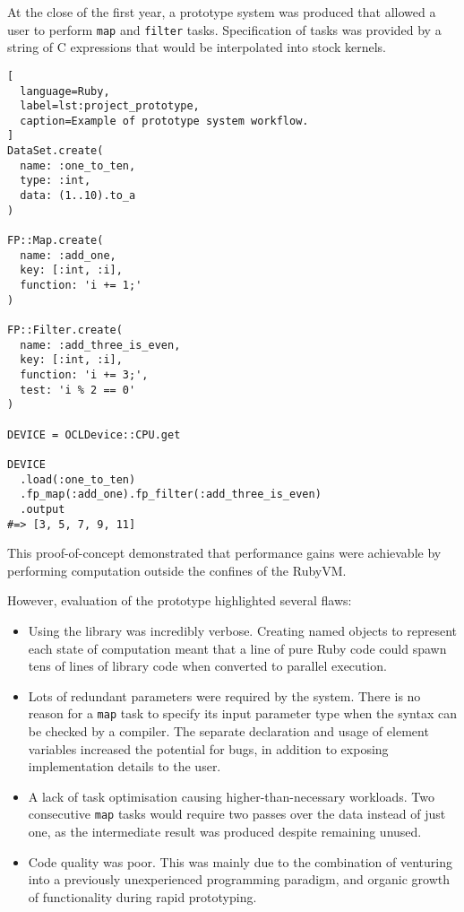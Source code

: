 At the close of the first year, a prototype system was produced that allowed a user to perform \verb|map| and \verb|filter| tasks.
Specification of tasks was provided by a string of C expressions that would be interpolated into stock kernels.
\begin{lstlisting}[
  language=Ruby,
  label=lst:project_prototype,
  caption=Example of prototype system workflow.
]
DataSet.create(
  name: :one_to_ten,
  type: :int,
  data: (1..10).to_a
)

FP::Map.create(
  name: :add_one,
  key: [:int, :i],
  function: 'i += 1;'
)

FP::Filter.create(
  name: :add_three_is_even,
  key: [:int, :i],
  function: 'i += 3;',
  test: 'i % 2 == 0'
)

DEVICE = OCLDevice::CPU.get

DEVICE
  .load(:one_to_ten)
  .fp_map(:add_one).fp_filter(:add_three_is_even)
  .output
#=> [3, 5, 7, 9, 11]
\end{lstlisting}
This proof-of-concept demonstrated that performance gains were achievable by performing computation outside the confines of the \ac{RubyVM}.

However, evaluation of the prototype highlighted several flaws:
\begin{itemize}
    \item Using the library was incredibly verbose. Creating named objects to represent each state of computation meant that a line of pure Ruby code could spawn tens of lines of library code when converted to parallel execution.

    \item Lots of redundant parameters were required by the system. There is no reason for a \verb|map| task to specify its input parameter type when the syntax can be checked by a compiler. The separate declaration and usage of element variables increased the potential for bugs, in addition to exposing implementation details to the user.

    \item A lack of task optimisation causing higher-than-necessary workloads. Two consecutive \verb|map| tasks would require two passes over the data instead of just one, as the intermediate result was produced despite remaining unused.

    \item Code quality was poor. This was mainly due to the combination of venturing into a previously unexperienced programming paradigm, and organic growth of functionality during rapid prototyping.
\end{itemize}

